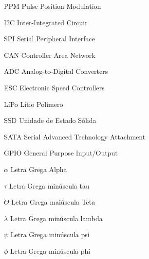 \documentclass[
	12pt,					%
	openright,				%
	oneside,					%
	a4paper,					%
	english,					%
	brazil					%
	]{abntex2}
\begin{document}
\begin{siglas}
  \item [PPM] Pulse Position Modulation
  \item [I2C] Inter-Integrated Circuit
  \item [SPI] Serial Peripheral Interface
  \item [CAN] Controller Area Network
  \item [ADC] Analog-to-Digital Converters
  \item [ESC] Electronic Speed Controllers
  \item [LíPo] Lítio Polimero
  \item [SSD] Unidade de Estado Sólida
  \item [SATA] Serial Advanced Technology Attachment 
  \item [GPIO] General Purpose Input/Output
\end{siglas}

\begin{simbolos}
  	\item[$ \alpha $] Letra Grega Alpha
  	\item[$ \tau $] Letra Grega minúscula tau 
  	\item[$ \Theta $] Letra Grega maiúscula Teta
	\item[$ \lambda $] Letra Grega minúscula lambda
	\item[$ \psi $] Letra Grega minúscula psi
	\item[$ \phi $] Letra Grega minúscula phi 
\end{simbolos}

\tableofcontents*
\cleardoublepage

\textual
\setcounter{page}{1}



%




\end{document}
